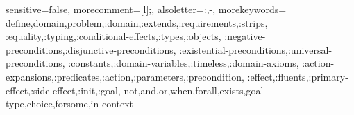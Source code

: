 {
  sensitive=false,    %
  morecomment=[l]{;}, %
  alsoletter={:,-},   %
  morekeywords={
    define,domain,problem,:domain,:extends,:requirements,:strips,
    :equality,:typing,:conditional-effects,:types,:objects,
    :negative-preconditions,:disjunctive-preconditions,
    :existential-preconditions,:universal-preconditions,
    :constants,:domain-variables,:timeless,:domain-axioms,
    :action-expansions,:predicates,:action,:parameters,:precondition,
    :effect,:fluents,:primary-effect,:side-effect,:init,:goal,
    not,and,or,when,forall,exists,goal-type,choice,forsome,in-context
  }
}
